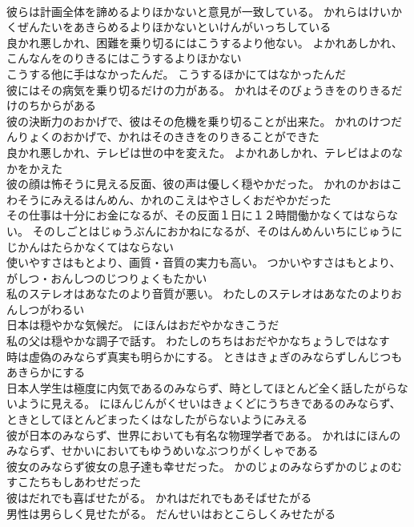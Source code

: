 \documentclass[8pt]{extreport}
\begin{document}
\begin{CJK}{UTF8}{min}
\\	彼らは計画全体を諦めるよりほかないと意見が一致している。	かれらはけいかくぜんたいをあきらめるよりほかないといけんがいっちしている 
\\	良かれ悪しかれ、困難を乗り切るにはこうするより他ない。	よかれあしかれ、こんなんをのりきるにはこうするよりほかない 
\\	こうする他に手はなかったんだ。	こうするほかにてはなかったんだ 
\\	彼にはその病気を乗り切るだけの力がある。	かれはそのびょうきをのりきるだけのちからがある 
\\	彼の決断力のおかげで、彼はその危機を乗り切ることが出来た。	かれのけつだんりょくのおかげで、かれはそのききをのりきることができた 
\\	良かれ悪しかれ、テレビは世の中を変えた。	よかれあしかれ、テレビはよのなかをかえた 
\\	彼の顔は怖そうに見える反面、彼の声は優しく穏やかだった。	かれのかおはこわそうにみえるはんめん、かれのこえはやさしくおだやかだった 
\\	その仕事は十分にお金になるが、その反面１日に１２時間働かなくてはならない。	そのしごとはじゅうぶんにおかねになるが、そのはんめんいちにじゅうにじかんはたらかなくてはならない 
\\	使いやすさはもとより、画質・音質の実力も高い。	つかいやすさはもとより、がしつ・おんしつのじつりょくもたかい 
\\	私のステレオはあなたのより音質が悪い。	わたしのステレオはあなたのよりおんしつがわるい 
\\	日本は穏やかな気候だ。	にほんはおだやかなきこうだ 
\\	私の父は穏やかな調子で話す。	わたしのちちはおだやかなちょうしではなす 
\\	時は虚偽のみならず真実も明らかにする。	ときはきょぎのみならずしんじつもあきらかにする 
\\	日本人学生は極度に内気であるのみならず、時としてほとんど全く話したがらないように見える。	にほんじんがくせいはきょくどにうちきであるのみならず、ときとしてほとんどまったくはなしたがらないようにみえる 
\\	彼が日本のみならず、世界においても有名な物理学者である。	かれはにほんのみならず、せかいにおいてもゆうめいなぶつりがくしゃである 
\\	彼女のみならず彼女の息子達も幸せだった。	かのじょのみならずかのじょのむすこたちもしあわせだった 
\\	彼はだれでも喜ばせたがる。	かれはだれでもあそばせたがる 
\\	男性は男らしく見せたがる。	だんせいはおとこらしくみせたがる 

\end{CJK}
\end{document}
